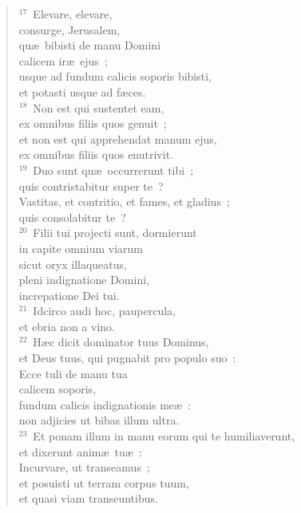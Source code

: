 \begin{verse}${}^{17}$~Elevare, elevare,\\ consurge, Jerusalem,\\ qu\ae\ bibisti de manu Domini\\ calicem ir\ae\ ejus~;\\ usque ad fundum calicis soporis bibisti,\\ et potasti usque ad f\ae ces.\\
${}^{18}$~Non est qui sustentet eam,\\ ex omnibus filiis quos genuit~;\\ et non est qui apprehendat manum ejus,\\ ex omnibus filiis quos enutrivit.\\
${}^{19}$~Duo sunt qu\ae\ occurrerunt tibi~;\\ quis contristabitur super te~?\\ Vastitas, et contritio, et fames, et gladius~;\\ quis consolabitur te~?\\
${}^{20}$~Filii tui projecti sunt, dormierunt\\ in capite omnium viarum\\ sicut oryx illaqueatus,\\ pleni indignatione Domini,\\ increpatione Dei tui.\\
${}^{21}$~Idcirco audi hoc, paupercula,\\ et ebria non a vino.\\
${}^{22}$~H\ae c dicit dominator tuus Dominus,\\ et Deus tuus, qui pugnabit pro populo suo~:\\ Ecce tuli de manu tua\\ calicem soporis,\\ fundum calicis indignationis me\ae~:\\ non adjicies ut bibas illum ultra.\\
${}^{23}$~Et ponam illum in manu eorum qui te humiliaverunt,\\ et dixerunt anim\ae\ tu\ae~:\\ Incurvare, ut transeamus~;\\ et posuisti ut terram corpus tuum,\\ et quasi viam transeuntibus.\end{verse}


